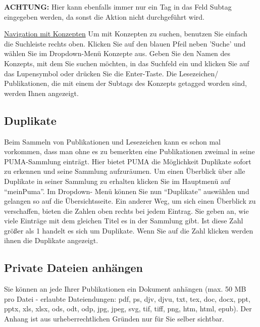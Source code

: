 \begin{shaded} 
\centering\textbf{ACHTUNG:} Hier kann ebenfalls immer nur ein Tag in das Feld Subtag eingegeben werden, da sonst die Aktion nicht durchgeführt wird.
\end{shaded}
\underline{Navigation mit Konzepten}
\newline
Um mit Konzepten zu suchen, benutzen Sie einfach die Suchleiste rechts oben. Klicken Sie auf den blauen Pfeil neben 'Suche' und wählen Sie im Dropdown-Menü Konzepte aus. Geben Sie den Namen des Konzepts, mit dem Sie suchen möchten, in das Suchfeld ein und klicken Sie auf das Lupensymbol oder drücken Sie die Enter-Taste. Die Lesezeichen/ Publikationen, die mit einem der Subtags des Konzepts getagged worden sind, werden Ihnen angezeigt. 
\subsection{Duplikate}
Beim Sammeln von Publikationen und Lesezeichen kann es schon mal vorkommen, dass man ohne es zu bemerkten eine Publikationen zweimal in seine PUMA-Sammlung einträgt. Hier bietet PUMA die Möglichkeit Duplikate sofort zu erkennen und seine Sammlung aufzuräumen. Um einen Überblick über alle Duplikate in seiner Sammlung zu erhalten klicken Sie im Hauptmenü auf \enquote{meinPuma}. Im Dropdown- Menü können Sie nun \enquote{Duplikate} auswählen und gelangen so auf die Übersichtsseite. Ein anderer Weg, um sich einen Überblick zu verschaffen, bieten die Zahlen oben rechts bei jedem Eintrag. Sie geben an, wie viele Einträge mit dem gleichen Titel es in der Sammlung gibt. Ist diese Zahl größer als 1 handelt es sich um Duplikate. Wenn Sie auf die Zahl klicken werden ihnen die Duplikate angezeigt.
\subsection{Private Dateien anhängen}
Sie können an jede Ihrer Publikationen ein Dokument anhängen (max. 50 MB pro Datei - erlaubte Dateiendungen: pdf, ps, djv, djvu, txt, tex, doc, docx, ppt, pptx, xls, xlsx, ods, odt, odp, jpg, jpeg, svg, tif, tiff, png, htm, html, epub). Der Anhang ist aus urheberrechtlichen Gründen nur für Sie selber sichtbar.

